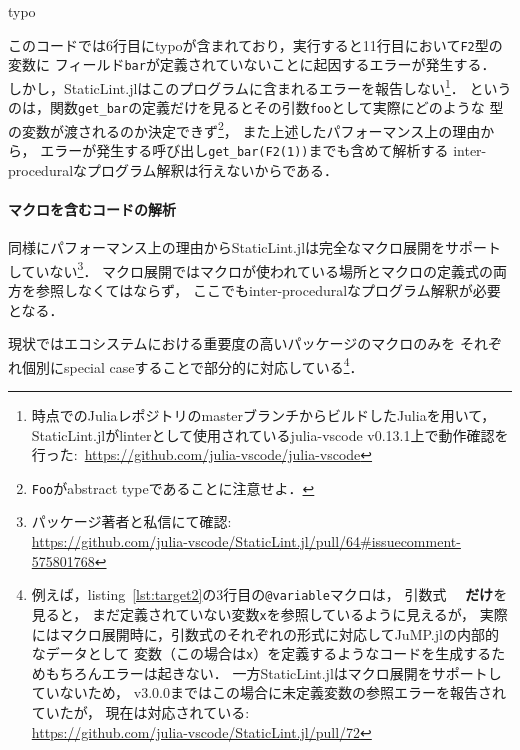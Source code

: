 \begin{listing}[ht]
  \inputminted[frame=lines, linenos, firstnumber=1, firstline=23, lastline=33]{julia}{./src/typo.jl}
  \caption{typo}
  \label{lst:target3}
\end{listing}

このコードでは6行目にtypoが含まれており，実行すると11行目において\verb|F2|型の変数に
フィールド\verb|bar|が定義されていないことに起因するエラーが発生する．
しかし，StaticLint.jlはこのプログラムに含まれるエラーを報告しない\footnote{
  \date{\today}時点でのJuliaレポジトリのmasterブランチからビルドしたJuliaを用いて，
  StaticLint.jlがlinterとして使用されているjulia-vscode v0.13.1上で動作確認を行った:\
  \url{https://github.com/julia-vscode/julia-vscode}
}．
というのは，関数\verb|get_bar|の定義だけを見るとその引数\verb|foo|として実際にどのような
型の変数が渡されるのか決定できず\footnote{
  \texttt{Foo}がabstract typeであることに注意せよ．
}，
また上述したパフォーマンス上の理由から，
エラーが発生する呼び出し\verb|get_bar(F2(1))|までも含めて解析する
inter-proceduralなプログラム解釈は行えないからである．

\paragraph{マクロを含むコードの解析} \label{paragraph:analyse-code-including-macro}

同様にパフォーマンス上の理由からStaticLint.jlは完全なマクロ展開をサポートしていない\footnote{
  パッケージ著者と私信にて確認:\\
  \url{https://github.com/julia-vscode/StaticLint.jl/pull/64\#issuecomment-575801768}
}．
マクロ展開ではマクロが使われている場所とマクロの定義式の両方を参照しなくてはならず，
ここでもinter-proceduralなプログラム解釈が必要となる．

現状ではエコシステムにおける重要度の高いパッケージのマクロのみを
それぞれ個別にspecial caseすることで部分的に対応している\footnote{
  例えば，listing~\ref{lst:target2}の3行目の\texttt{@variable}マクロは，
  引数式　 \textbf{だけ}を見ると，
  まだ定義されていない変数\texttt{x}を参照しているように見えるが，
  実際にはマクロ展開時に，引数式のそれぞれの形式に対応してJuMP.jlの内部的なデータとして
  変数（この場合は\texttt{x}）を定義するようなコードを生成するためもちろんエラーは起きない．
  一方StaticLint.jlはマクロ展開をサポートしていないため，
  v3.0.0まではこの場合に未定義変数の参照エラーを報告されていたが，
  現在は対応されている:\\
  \url{https://github.com/julia-vscode/StaticLint.jl/pull/72}
}．

